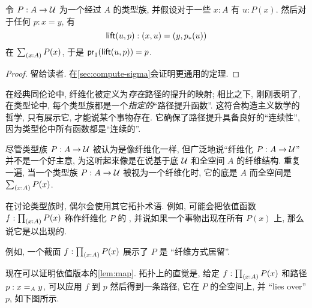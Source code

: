 \begin{lem}[路径提升性质]
    \label{thm:path-lifting}
    令 $P:A\to\type$ 为一个经过 $A$ 的类型族, 并假设对于一些 $x:A$ 有 $u:P(x)$.
    然后对于任何 $p:x=y$, 有
    \begin{equation*}
        \mathsf{lift}(u,p):(x,u)=(y,\trans{p}{u})
    \end{equation*}
    在 $\sm{x:A}P(x)$, 于是 $\ap{\proj1}{\mathsf{lift}(u,p)} = p$.
\end{lem}
\begin{proof}
    留给读者.
    在\cref{sec:compute-sigma}会证明更通用的定理.
\end{proof}

在经典同伦论中, 纤维化被定义为\emph{存在}路径的提升的映射;
相比之下, 刚刚表明了, 在类型论中, 每个类型族都是一个\emph{指定的}``路径提升函数''.
这符合构造主义数学的哲学, 只有展示它, 才能说某个事物存在.
%
它确保了路径提升具备良好的``连续性'', 因为类型伦中所有函数都是``连续的''.

\begin{rmk}
    尽管类型族 $P:A\to \type$ 被认为是像纤维化一样, 但广泛地说``纤维化 $P:A\to\type$'' 并不是一个好主意, 为这听起来像是在说基于底 $\type$ 和全空间 $A$ 的纤维结构.
    重复一遍, 当一个类型族 $P:A\to \type$ 被视为一个纤维化时, 它的底是 $A$ 而全空间是 $\sm{x:A} P(x)$.

    在讨论类型族时, 偶尔会使用其它拓扑术语.
    例如, 可能会把依值函数 $f:\prd{x:A} P(x)$ 称作纤维化 $P$ 的
    , 并说如果一个事物出现在所有 $P(x)$ 上, 那么说它是以出现的.

    例如, 一个截面 $f:\prd{x:A} P(x)$ 展示了 $P$ 是 ``纤维方式居留''.
\end{rmk}

现在可以证明依值版本的\cref{lem:map}.
拓扑上的直觉是, 给定 $f:\prd{x:A} P(x)$ 和路径 $p:\id[A]xy$, 可以应用 $f$ 到 $p$ 然后得到一条路径, 它在 $P$ 的全空间上, 并 ``lies over'' $p$, 如下图所示.

\begin{center}
\end{center}

